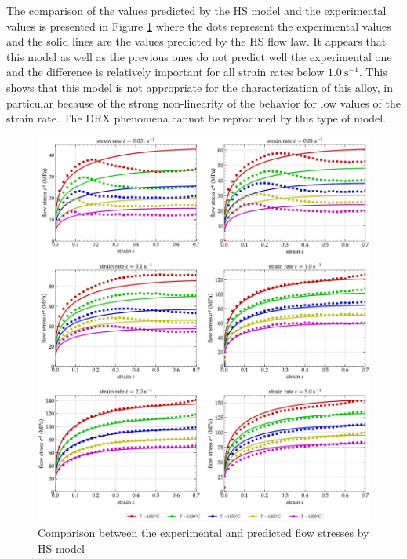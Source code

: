 \documentclass[twoside,english,1p,final,sort&compress]{elsarticle}
\theoremstyle{plain}
\newcommand{\ps}{\text{s}^{-1}}
\begin{document}
The comparison of the values predicted by the HS model and the experimental values is presented in Figure \ref{fig:iCorrelationHS} where the dots represent the experimental values and the solid lines are the values predicted by the HS flow law. 
It appears that this model as well as the previous ones do not predict well the experimental one and the difference is relatively important for all strain rates below $1.0~\ps$. 
This shows that this model is not appropriate for the characterization of this alloy, in particular because of the strong non-linearity of the behavior for low values of the strain rate. 
The DRX phenomena cannot be reproduced by this type of model.

\begin{figure}[!ht]
\centering
\includegraphics[width=1.02\columnwidth]
{Figures/CompExpHS}
\caption{Comparison between the experimental and predicted flow stresses by HS model}
\label{fig:iCorrelationHS}
\end{figure}

\end{document}
